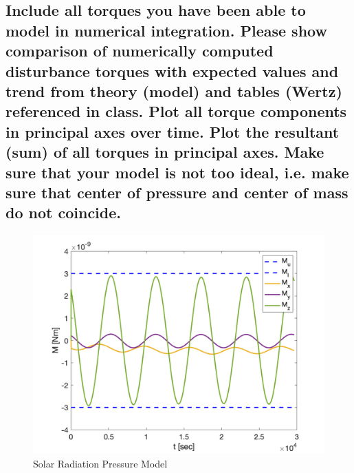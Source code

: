 \subsection{Include all torques you have been able to model in numerical integration. Please show comparison of numerically computed disturbance torques with expected values and trend from theory (model) and tables (Wertz) referenced in class. Plot all torque components in principal axes over time. Plot the resultant (sum) of all torques in principal axes. Make sure that your model is not too ideal, i.e. make sure that center of pressure and center of mass do not coincide. }

\begin{figure}[H]
    \centering
    \captionsetup{justification = centering}
    \includegraphics[width = 15cm]{Images/PS5/magnetic_torque.png}
    \caption{Solar Radiation Pressure Model}
    \label{fig:simulink_sol}
\end{figure}